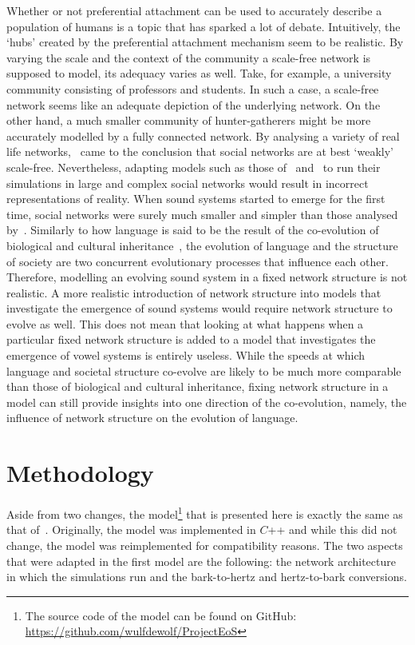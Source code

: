 \documentclass[11pt]{article}
\begin{document}
Whether or not preferential attachment can be used to accurately describe a population of humans is a topic that has
sparked a lot of debate. Intuitively, the `hubs' created by the preferential attachment mechanism seem to be realistic.
By varying the scale and the context of the community a scale-free network is supposed to model, its adequacy varies as
well. Take, for example, a university community consisting of professors and students. In such a case, a scale-free
network seems like an adequate depiction of the underlying network. On the other hand, a much smaller community of
hunter-gatherers might be more accurately modelled by a fully connected network. By analysing a variety of real life
networks,~ came to the conclusion that social networks are at best `weakly'
scale-free. Nevertheless, adapting models such as those of~
and~ to run their simulations in large and complex social networks
would result in incorrect representations of reality. When sound systems started to emerge for the first time, social
networks were surely much smaller and simpler than those analysed by~.
Similarly to how language is said to be the result of the co-evolution of biological and cultural
inheritance~, the evolution of language and the structure of
society are two concurrent evolutionary processes that influence each other. Therefore, modelling an evolving sound
system in a fixed network structure is not realistic. A more realistic introduction of network structure into models
that investigate the emergence of sound systems would require network structure to evolve as well. This does not mean
that looking at what happens when a particular fixed network structure is added to a model that investigates the
emergence of vowel systems is entirely useless. While the speeds at which language and societal structure co-evolve are
likely to be much more comparable than those of biological and cultural inheritance, fixing network structure in a
model can still provide insights into one direction of the co-evolution, namely, the influence of network structure on
the evolution of language.

\section{Methodology\label{sec:methods}}
Aside from two changes, the model\footnote{The source code of the model can be found on GitHub:
    \url{https://github.com/wulfdewolf/ProjectEoS}} that is presented here is exactly the same as that
of~. Originally, the model was implemented in $C$++ and while this did
not change, the model was reimplemented for compatibility reasons. The two aspects that were adapted in  the first
model are the following: the network architecture in which the simulations run and the bark-to-hertz and hertz-to-bark
conversions.
\end{document}
